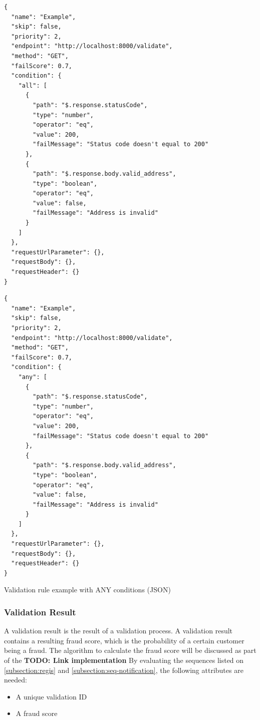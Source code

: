 \begin{lstlisting}[caption={Validation rule example with ALL conditions (JSON)}]
{
  "name": "Example",
  "skip": false,
  "priority": 2,
  "endpoint": "http://localhost:8000/validate",
  "method": "GET",
  "failScore": 0.7,
  "condition": {
    "all": [
      {
        "path": "$.response.statusCode",
        "type": "number",
        "operator": "eq",
        "value": 200,
        "failMessage": "Status code doesn't equal to 200"
      },
      {
        "path": "$.response.body.valid_address",
        "type": "boolean",
        "operator": "eq",
        "value": false,
        "failMessage": "Address is invalid"
      }
    ]
  },
  "requestUrlParameter": {},
  "requestBody": {},
  "requestHeader": {}
}
\end{lstlisting}

\begin{listing}
\begin{verbatim}
{
  "name": "Example",
  "skip": false,
  "priority": 2,
  "endpoint": "http://localhost:8000/validate",
  "method": "GET",
  "failScore": 0.7,
  "condition": {
    "any": [
      {
        "path": "$.response.statusCode",
        "type": "number",
        "operator": "eq",
        "value": 200,
        "failMessage": "Status code doesn't equal to 200"
      },
      {
        "path": "$.response.body.valid_address",
        "type": "boolean",
        "operator": "eq",
        "value": false,
        "failMessage": "Address is invalid"
      }
    ]
  },
  "requestUrlParameter": {},
  "requestBody": {},
  "requestHeader": {}
}
\end{verbatim}
\caption{Validation rule example with ANY conditions (JSON)}
\end{listing}

\subsubsection{Validation Result}

A validation result is the result of a validation process. A validation result contains a resulting fraud score, which is the probability of a certain customer being a fraud. The algorithm to calculate the fraud score will be discussed as part of the \textbf{TODO: Link implementation}
By evaluating the sequences listed on \autoref{subsection:regis} and \autoref{subsection:seq-notification}, the following attributes are needed:

\begin{itemize}
  \item A unique validation ID
  \item A fraud score 
\end{itemize}

